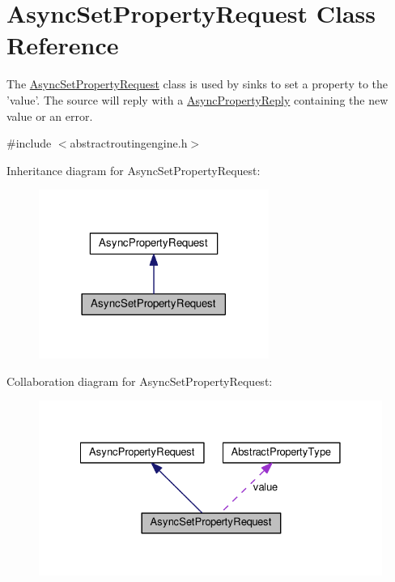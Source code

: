 \hypertarget{classAsyncSetPropertyRequest}{\section{Async\+Set\+Property\+Request Class Reference}
\label{classAsyncSetPropertyRequest}
}


The \hyperlink{classAsyncSetPropertyRequest}{Async\+Set\+Property\+Request} class is used by sinks to set a property to the 'value'. The source will reply with a \hyperlink{classAsyncPropertyReply}{Async\+Property\+Reply} containing the new value or an error.  




{\ttfamily \#include $<$abstractroutingengine.\+h$>$}



Inheritance diagram for Async\+Set\+Property\+Request\+:\nopagebreak
\begin{figure}[H]
\begin{center}
\leavevmode
\includegraphics[width=213pt]{classAsyncSetPropertyRequest__inherit__graph}
\end{center}
\end{figure}


Collaboration diagram for Async\+Set\+Property\+Request\+:\nopagebreak
\begin{figure}[H]
\begin{center}
\leavevmode
\includegraphics[width=328pt]{classAsyncSetPropertyRequest__coll__graph}
\end{center}
\end{figure}
